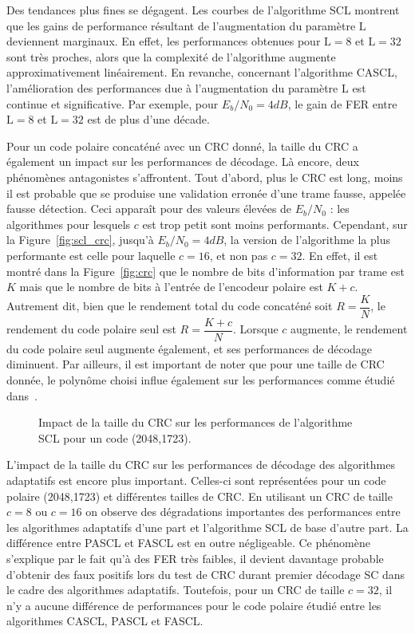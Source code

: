 Des tendances plus fines se dégagent. Les courbes de l'algorithme SCL montrent que les gains de performance résultant de l'augmentation du paramètre $\mathrm{L}$ deviennent marginaux. En effet, les performances obtenues pour $\mathrm{L}=8$ et $\mathrm{L}=32$ sont très proches, alors que la complexité de l'algorithme augmente approximativement linéairement. En revanche, concernant l'algorithme CASCL, l'amélioration des performances due à l'augmentation du paramètre $\mathrm{L}$ est continue et significative. Par exemple, pour $E_b/N_0=4dB$, le gain de FER entre $\mathrm{L}=8$ et $\mathrm{L}=32$ est de plus d'une décade.

Pour un code polaire concaténé avec un CRC donné, la taille du CRC a également un impact sur les performances de décodage. Là encore, deux phénomènes antagonistes s'affrontent. 
Tout d'abord, plus le CRC est long, moins il est probable que se produise une validation erronée d'une trame fausse, appelée fausse détection. Ceci apparaît pour des valeurs élevées de $E_b/N_0$ : les algorithmes pour lesquels $c$ est trop petit sont moins performants.
Cependant, sur la Figure~\ref{fig:scl_crc}, jusqu'à $E_b/N_0=4dB$, la version de l'algorithme la plus performante est celle pour laquelle $c=16$, et non pas $c=32$.
En effet, il est montré dans la Figure~\ref{fig:crc} que le nombre de bits d'information par trame est $K$ mais que le nombre de bits à l'entrée de l'encodeur polaire est $K+c$. Autrement dit, bien que le rendement total du code concaténé soit $R=\dfrac{K}{N}$, le rendement du code polaire seul est $R=\dfrac{K+c}{N}$. Lorsque $c$ augmente, le rendement du code polaire seul augmente également, et ses performances de décodage diminuent. Par ailleurs, il est important de noter que pour une taille de CRC donnée, le polynôme choisi influe également sur les performances comme étudié dans~\cite{zhang_crc_2017}.
\begin{figure}[t]
  \centering
  \caption{Impact de la taille du CRC sur les performances de l'algorithme SCL pour un code (2048,1723).}
\end{figure}

L'impact de la taille du CRC sur les performances de décodage des algorithmes adaptatifs est encore plus important. Celles-ci sont représentées pour un code polaire (2048,1723) et différentes tailles de CRC. En utilisant un CRC de taille $c=8$ ou $c=16$ on observe des dégradations importantes des performances entre les algorithmes adaptatifs d'une part et l'algorithme SCL de base d'autre part. La différence entre PASCL et FASCL est en outre négligeable. Ce phénomène s'explique par le fait qu'à des FER très faibles, il devient davantage probable d'obtenir des faux positifs lors du test de CRC durant premier décodage SC dans le cadre des algorithmes adaptatifs. Toutefois, pour un CRC de taille $c=32$, il n'y a aucune différence de performances pour le code polaire étudié entre les algorithmes CASCL, PASCL et FASCL.

